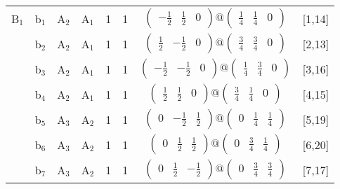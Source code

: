 \documentclass[fleqn,10pt,landscape]{article}
\begin{document}
\begin{itemize}
\begin{center}
\begin{longtable}{cc|cc|c|c|c|l}
B$_{1}$ & b$_{1}$ & A$_{2}$ & A$_{1}$ & 1 & 1 & $\begin{pmatrix} - \frac{1}{2} & \frac{1}{2} & 0 \end{pmatrix}@\begin{pmatrix} \frac{1}{4} & \frac{1}{4} & 0 \end{pmatrix}$ & [1,14] \\
& b$_{2}$ & A$_{2}$ & A$_{1}$ & 1 & 1 & $\begin{pmatrix} \frac{1}{2} & - \frac{1}{2} & 0 \end{pmatrix}@\begin{pmatrix} \frac{3}{4} & \frac{3}{4} & 0 \end{pmatrix}$ & [2,13] \\
& b$_{3}$ & A$_{2}$ & A$_{1}$ & 1 & 1 & $\begin{pmatrix} - \frac{1}{2} & - \frac{1}{2} & 0 \end{pmatrix}@\begin{pmatrix} \frac{1}{4} & \frac{3}{4} & 0 \end{pmatrix}$ & [3,16] \\
& b$_{4}$ & A$_{2}$ & A$_{1}$ & 1 & 1 & $\begin{pmatrix} \frac{1}{2} & \frac{1}{2} & 0 \end{pmatrix}@\begin{pmatrix} \frac{3}{4} & \frac{1}{4} & 0 \end{pmatrix}$ & [4,15] \\
& b$_{5}$ & A$_{3}$ & A$_{2}$ & 1 & 1 & $\begin{pmatrix} 0 & - \frac{1}{2} & \frac{1}{2} \end{pmatrix}@\begin{pmatrix} 0 & \frac{1}{4} & \frac{1}{4} \end{pmatrix}$ & [5,19] \\
& b$_{6}$ & A$_{3}$ & A$_{2}$ & 1 & 1 & $\begin{pmatrix} 0 & \frac{1}{2} & \frac{1}{2} \end{pmatrix}@\begin{pmatrix} 0 & \frac{3}{4} & \frac{1}{4} \end{pmatrix}$ & [6,20] \\
& b$_{7}$ & A$_{3}$ & A$_{2}$ & 1 & 1 & $\begin{pmatrix} 0 & \frac{1}{2} & - \frac{1}{2} \end{pmatrix}@\begin{pmatrix} 0 & \frac{3}{4} & \frac{3}{4} \end{pmatrix}$ & [7,17] \\

\end{longtable}
\end{center}
\end{itemize}
\end{document}

